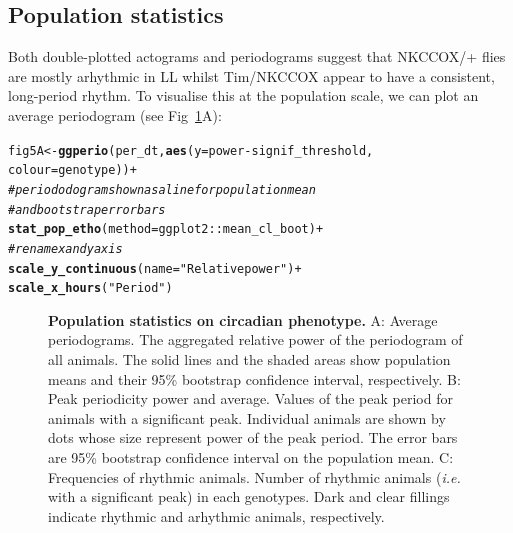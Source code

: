 \documentclass[10pt,letterpaper]{article}\usepackage[]{graphicx}\usepackage[]{color}
\makeatletter
\newcommand{\hlstr}[1]{\textcolor[rgb]{0.192,0.494,0.8}{#1}}%
\newcommand{\hlcom}[1]{\textcolor[rgb]{0.678,0.584,0.686}{\textit{#1}}}%
\newcommand{\hlopt}[1]{\textcolor[rgb]{0,0,0}{#1}}%
\newcommand{\hlstd}[1]{\textcolor[rgb]{0.345,0.345,0.345}{#1}}%
\newcommand{\hlkwb}[1]{\textcolor[rgb]{0.69,0.353,0.396}{#1}}%
\newcommand{\hlkwc}[1]{\textcolor[rgb]{0.333,0.667,0.333}{#1}}%
\newcommand{\hlkwd}[1]{\textcolor[rgb]{0.737,0.353,0.396}{\textbf{#1}}}%
\newenvironment{kframe}{%
 \def\at@end@of@kframe{}%
 \ifinner\ifhmode%
  \def\at@end@of@kframe{\end{minipage}}%
  \begin{minipage}{\columnwidth}%
 \fi\fi%
 \def\FrameCommand##1{\hskip\@totalleftmargin \hskip-\fboxsep
 \colorbox{shadecolor}{##1}\hskip-\fboxsep
     \hskip-\linewidth \hskip-\@totalleftmargin \hskip\columnwidth}%
 \MakeFramed {\advance\hsize-\width
   \@totalleftmargin\z@ \linewidth\hsize
   \@setminipage}}%
 {\par\unskip\endMakeFramed%
 \at@end@of@kframe}
\newenvironment{knitrout}{}{} %
\makeatother
\begin{document}
\subsection*{Population statistics}
Both double-plotted actograms and periodograms suggest that NKCCOX/+ flies are mostly 
arhythmic in LL whilst Tim/NKCCOX appear to have a consistent, long-period rhythm.
To visualise this at the population scale, we can plot an average periodogram (see Fig~\ref{fig:fig-5}A):

\begin{knitrout}
\color{fgcolor}\begin{kframe}
\begin{alltt}
\hlstd{fig5A} \hlkwb{<-} \hlkwd{ggperio}\hlstd{(per_dt,} \hlkwd{aes}\hlstd{(}\hlkwc{y} \hlstd{= power} \hlopt{-} \hlstd{signif_threshold,}
                             \hlkwc{colour} \hlstd{= genotype))} \hlopt{+}
          \hlcom{# periododogram shown as a line for population mean}
          \hlcom{# and bootstrap error bars}
          \hlkwd{stat_pop_etho}\hlstd{(}\hlkwc{method} \hlstd{= ggplot2}\hlopt{::}\hlstd{mean_cl_boot)} \hlopt{+}
          \hlcom{# rename x and y axis }
          \hlkwd{scale_y_continuous}\hlstd{(}\hlkwc{name}\hlstd{=}\hlstr{"Relative power"}\hlstd{)} \hlopt{+}
          \hlkwd{scale_x_hours}\hlstd{(}\hlstr{"Period"}\hlstd{)}
\end{alltt}
\end{kframe}
\end{knitrout}



\begin{figure}[!h]
	\caption{{\bf Population statistics on circadian phenotype.}
			A: Average periodograms. 
			      The aggregated relative power of the periodogram of all animals.
			      The solid lines and the shaded areas show population means and their 95\% bootstrap confidence interval, respectively.
			B: Peak periodicity power and average.
			      Values of the peak period for animals with a significant peak.
			      Individual animals are shown by dots whose size represent power of the peak period.
			      The error bars are 95\% bootstrap confidence interval on the population mean.
			C: Frequencies of rhythmic animals.
			      Number of rhythmic animals (\emph{i.e.} with a significant peak) in each genotypes.
			      Dark and clear fillings indicate rhythmic and arhythmic animals, respectively.
			      }
	\label{fig:fig-5}
\end{figure}
\end{document}

